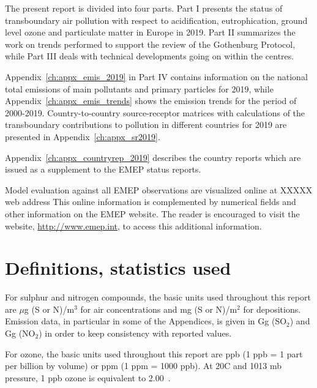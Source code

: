 The present report is divided into four parts. Part I presents the status
of transboundary air pollution with respect to acidification, eutrophication,
ground level ozone and particulate matter in Europe in 2019.
Part II summarizes the work on trends performed to support the review of the Gothenburg Protocol, while Part III deals with technical developments going on within the centres.

Appendix~\ref{ch:appx_emis_2019} in Part IV contains information on the national total emissions of main pollutants and  primary particles for 2019, while Appendix~\ref{ch:appx_emis_trends} shows the  emission trends for the period of 2000-2019. Country-to-country source-receptor matrices with calculations of
the transboundary contributions to pollution in different countries
for 2019 are presented in Appendix~\ref{ch:appx_sr2019}.

Appendix~\ref{ch:appx_countryrep_2019} describes the country
reports which are  issued as a supplement to the EMEP status reports.

Model evaluation against all EMEP observations are visualized online at XXXXX web address
This online information is complemented by numerical fields and other
information on the EMEP website. The reader is encouraged to visit the
website, \url{http://www.emep.int}, to access this additional information.



\section{Definitions, statistics used}
\label{DEFS}

For sulphur and nitrogen compounds, the basic units used throughout
this report are $\mu$g (S or N)/m$^{3}$ for air concentrations and
mg (S or N)/m$^{2}$ for depositions. Emission data, in particular in
some of the Appendices, is given in Gg (SO$_2$)  and Gg (NO$_2$) in
order to keep consistency with reported values.

For ozone, the basic units used throughout this report are ppb (1 ppb
= 1 part per billion by volume) or ppm (1 ppm = 1000 ppb).  At
20\degrees C and 1013 mb pressure, 1 ppb ozone is equivalent to
2.00~\ug.  \vspace{0.5cm}

